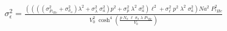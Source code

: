 


\begin{eqnarray*}
  \sigma_\epsilon^2 = \frac{\left(\left(\left(\left( \sigma_{P_{^3He}}^2 + \sigma_{\sigma_a}^2 \right) \lambda^2 + \sigma_\lambda^2 \; \sigma_a^2 \right) p^2 + \sigma_p^2 \; \lambda^2 \; \sigma_a^2 \right) \ell^2 + \sigma_\ell^2 \; p^2 \; \lambda^2 \; \sigma_a^2\right) Na^2 \; P_{^3He}^2} {V_0^2 \; \cosh^4\left(\frac{p \; N_a \; \ell \; \sigma_a \; \lambda \;  P_{^{3}He}}{V_0}\right)}
\end{eqnarray*}

